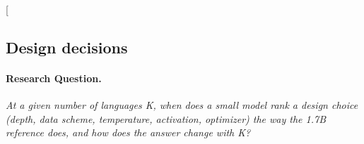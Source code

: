 \clearpage
\twocolumn[{%
\rqparent
\subsection{Design decisions}
\label{app:rq05_design_decisions}

\noindent\begin{minipage}[t]{0.485\textwidth}
\vspace{0pt}
\paragraph{Research Question.} \emph{At a given number of languages K, when does a small model rank a design choice (depth, data scheme, temperature, activation, optimizer) the way the 1.7B reference does, and how does the answer change with K?}


\end{minipage}}
